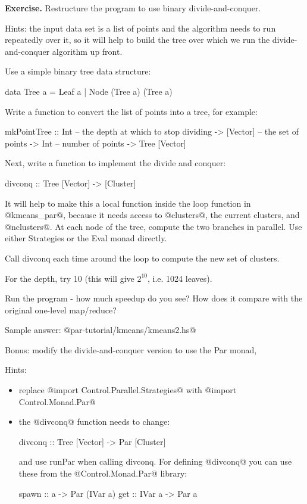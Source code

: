\documentclass[11pt,a4paper]{article}
\begin{document}
\noindent \textbf{Exercise.} Restructure the program to use binary divide-and-conquer.

Hints: the input data set is a list of points and the algorithm
needs to run repeatedly over it, so it will help to build the tree
over which we run the divide-and-conquer algorithm up front.

Use a simple binary tree data structure:

\begin{haskell}
data Tree a = Leaf a
            | Node (Tree a) (Tree a)
\end{haskell}

Write a function to convert the list of points into a tree, for
example:

\begin{haskell}
mkPointTree
   :: Int            -- the depth at which to stop dividing
   -> [Vector]       -- the set of points
   -> Int            -- number of points
   -> Tree [Vector]
\end{haskell}

Next, write a function to implement the divide and conquer:

\begin{haskell}
divconq :: Tree [Vector] -> [Cluster]
\end{haskell}

It will help to make this a local function inside the loop function in
@kmeans_par@, because it needs access to @clusters@, the current
clusters, and @nclusters@.  At each node of the tree, compute the two
branches in parallel.  Use either Strategies or the Eval monad
directly.

Call divconq each time around the loop to compute the new set of
clusters.

For the depth, try 10 (this will give $2^10$, i.e. 1024 leaves).

Run the program - how much speedup do you see?  How does it compare
with the original one-level map/reduce?

Sample answer: @par-tutorial/kmeans/kmeans2.hs@

Bonus: modify the divide-and-conquer version to use the Par monad,

Hints:
\begin{itemize}
\item replace @import Control.Parallel.Strategies@ with
    @import Control.Monad.Par@

\item the @divconq@ function needs to change:

  \begin{haskell}
      divconq :: Tree [Vector] -> Par [Cluster]
  \end{haskell}

    \noindent and use runPar when calling divconq.  For defining @divconq@ you
    can use these from the @Control.Monad.Par@ library:

  \begin{haskell}
      spawn :: a -> Par (IVar a)
      get   :: IVar a -> Par a
  \end{haskell}
\end{itemize}
\end{document}
